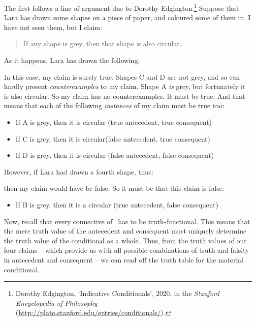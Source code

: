 The first follows a line of argument due to Dorothy Edgington.\footnote{Dorothy Edgington, `Indicative Conditionals', 2020, in the \emph{Stanford Encyclopedia of Philosophy} (\url{http://plato.stanford.edu/entries/conditionals/}).}  Suppose that Lara has drawn some shapes on a piece of paper, and coloured some of them in. I have not seen them, but I claim:
	\begin{quote}
		If any shape is grey, then that shape is also circular.
	\end{quote}
As it happens, Lara has drawn the following:
\begin{center}
\end{center}
In this case, my claim is surely true.  Shapes C and D are not grey, and so can hardly present \emph{counterexamples} to my claim. Shape A \emph{is} grey, but fortunately it is also circular. So my claim has no counterexamples. It must be true. And that means that each of the following \emph{instances} of my claim must be true too:
	\begin{itemize}
		\item If A is grey, then it is circular \hfill (true antecedent, true consequent)
		\item If C is grey, then it is circular\hfill (false antecedent, true consequent)
		\item If D is grey, then it is circular \hfill (false antecedent, false consequent)
	\end{itemize}
However, if Lara had drawn a fourth shape, thus:
\begin{center}
\end{center}
then my claim would have be false. So it must be that this claim is false:
	\begin{itemize}
		\item If B is grey, then it is a circular \hfill (true antecedent, false consequent)
	\end{itemize}
Now, recall that every connective of \TFL\ has to be truth-functional. This means that the mere truth value of the antecedent and consequent must uniquely determine the truth value of the conditional as a whole. Thus, from the truth values of our four claims – which provide us with all possible combinations of truth and falsity in antecedent and consequent – we can read off the truth table for the material conditional.

